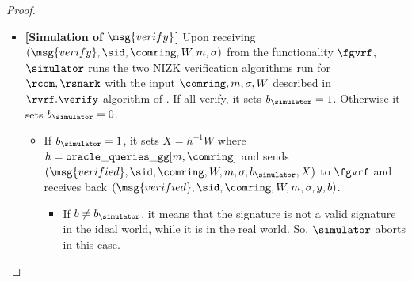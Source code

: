 \begin{proof}
\begin{itemize}
		
		\item \textbf{[Simulation of $ \msg{verify} $]} Upon receiving  $(\msg{verify}, \sid, \comring,W, m, \sigma)$ from the functionality $\fgvrf$, $ \simulator $ runs the two NIZK verification algorithms run for $ \rcom, \rsnark $ with the input $ \comring, m, \sigma, W $ described in $ \rvrf.\verify $ algorithm of \name. If  all verify, it sets $ b_{\simulator} =1 $. Otherwise it sets $ b_{\simulator} =0  $.
		
		\begin{itemize}
			\item 		If $ b_\simulator = 1 $, it sets $ X = h^{-1} W$ where $ h = \mathtt{oracle\_queries\_gg}[m, \comring] $ and sends  $ (\msg{verified}, \sid, \comring, W, m, \sigma, b_\simulator, X) $ to $ \fgvrf $ and receives back $ (\msg{verified}, \sid, \comring, W, m, \sigma, y, b) $. 
			\begin{itemize}
				\item If $ b \neq b_\simulator $, it means that the signature is not a valid signature in the ideal world, while it is in the real world. So, $ \simulator $ aborts in this case.
				

\end{itemize}
\end{itemize}
\end{itemize}
\end{proof}
